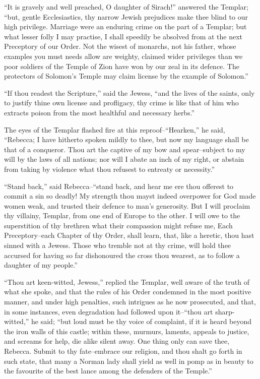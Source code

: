 ``It is gravely and well preached, O daughter of Sirach!'' answered the
Templar; ``but, gentle Ecclesiastics, thy narrow Jewish prejudices make
thee blind to our high privilege. Marriage were an enduring crime on the
part of a Templar; but what lesser folly I may practise, I shall
speedily be absolved from at the next Preceptory of our Order. Not the
wisest of monarchs, not his father, whose examples you must needs allow
are weighty, claimed wider privileges than we poor soldiers of the
Temple of Zion have won by our zeal in its defence. The protectors of
Solomon's Temple may claim license by the example of Solomon.''

``If thou readest the Scripture,'' said the Jewess, ``and the lives of
the saints, only to justify thine own license and profligacy, thy crime
is like that of him who extracts poison from the most healthful and
necessary herbs.''

The eyes of the Templar flashed fire at this reproof--``Hearken,'' he
said, ``Rebecca; I have hitherto spoken mildly to thee, but now my
language shall be that of a conqueror. Thou art the captive of my bow
and spear--subject to my will by the laws of all nations; nor will I
abate an inch of my right, or abstain from taking by violence what thou
refusest to entreaty or necessity.''

``Stand back,'' said Rebecca--``stand back, and hear me ere thou
offerest to commit a sin so deadly! My strength thou mayst indeed
overpower for God made women weak, and trusted their defence to man's
generosity. But I will proclaim thy villainy, Templar, from one end of
Europe to the other. I will owe to the superstition of thy brethren what
their compassion might refuse me, Each Preceptory--each Chapter of thy
Order, shall learn, that, like a heretic, thou hast sinned with a
Jewess. Those who tremble not at thy crime, will hold thee accursed for
having so far dishonoured the cross thou wearest, as to follow a
daughter of my people.''

``Thou art keen-witted, Jewess,'' replied the Templar, well aware of the
truth of what she spoke, and that the rules of his Order condemned in
the most positive manner, and under high penalties, such intrigues as he
now prosecuted, and that, in some instances, even degradation had
followed upon it--``thou art sharp-witted,'' he said; ``but loud must be
thy voice of complaint, if it is heard beyond the iron walls of this
castle; within these, murmurs, laments, appeals to justice, and screams
for help, die alike silent away. One thing only can save thee, Rebecca.
Submit to thy fate--embrace our religion, and thou shalt go forth in
such state, that many a Norman lady shall yield as well in pomp as in
beauty to the favourite of the best lance among the defenders of the
Temple.''


